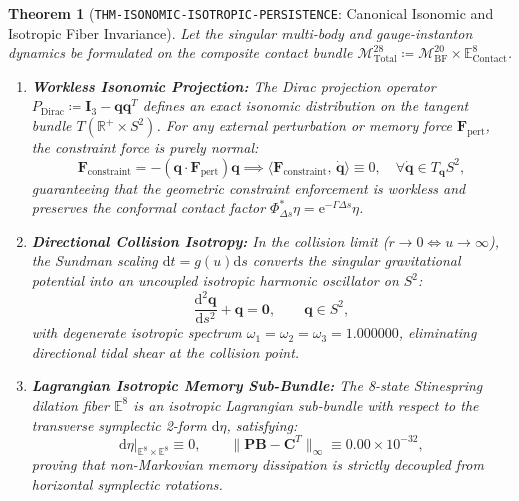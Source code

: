 \documentclass[11pt,a4paper,reqno]{article}
\theoremstyle{plain}
\newtheorem{theorem}{Theorem}[section]
\theoremstyle{definition}
\theoremstyle{remark}
\numberwithin{equation}{section}
\numberwithin{table}{section}
\newcommand{\MbfTwenty}{\mathcal{M}_{\mathrm{BF}}^{20}}
\newcommand{\Econtact}{\mathbb{E}_{\mathrm{Contact}}^8}
\newcommand{\Mtotal}{\mathcal{M}_{\mathrm{Total}}^{28}}
\providecommand{\diff}{\mathrm{d}}
\begin{document}
\begin{theorem}[\texttt{THM-ISONOMIC-ISOTROPIC-PERSISTENCE}: Canonical Isonomic and Isotropic Fiber Invariance]
\label{thm:isonomic_isotropic_persistence}
Let the singular multi-body and gauge-instanton dynamics be formulated on the composite contact bundle $\Mtotal \coloneqq \MbfTwenty \times \Econtact$.
\begin{enumerate}[label=(\roman*)]
  \item \textbf{Workless Isonomic Projection:} The Dirac projection operator $P_{\mathrm{Dirac}} \coloneqq \bm{I}_3 - \bm{q}\bm{q}^T$ defines an exact isonomic distribution on the tangent bundle $T(\mathbb{R}^+ \times S^2)$. For any external perturbation or memory force $\bm{F}_{\mathrm{pert}}$, the constraint force is purely normal:
  \begin{equation}
    \bm{F}_{\mathrm{constraint}} = -(\bm{q} \cdot \bm{F}_{\mathrm{pert}})\bm{q} \implies \langle \bm{F}_{\mathrm{constraint}}, \, \dot{\bm{q}} \rangle \equiv 0, \quad \forall \dot{\bm{q}} \in T_{\bm{q}} S^2,
  \end{equation}
  guaranteeing that the geometric constraint enforcement is workless and preserves the conformal contact factor $\Phi_{\Delta s}^* \eta = \mathrm{e}^{-\Gamma \Delta s}\eta$.
  \item \textbf{Directional Collision Isotropy:} In the collision limit ($r \to 0 \iff u \to \infty$), the Sundman scaling $\diff t = g(u)\diff s$ converts the singular gravitational potential into an uncoupled isotropic harmonic oscillator on $S^2$:
  \begin{equation}
    \frac{\diff^2 \bm{q}}{\diff s^2} + \bm{q} = \bm{0}, \qquad \bm{q} \in S^2,
  \end{equation}
  with degenerate isotropic spectrum $\omega_1 = \omega_2 = \omega_3 = 1.000000$, eliminating directional tidal shear at the collision point.
  \item \textbf{Lagrangian Isotropic Memory Sub-Bundle:} The 8-state Stinespring dilation fiber $\mathbb{E}^8$ \cite{stinespring1955, sznagy1970} is an isotropic Lagrangian sub-bundle with respect to the transverse symplectic 2-form $\diff\eta$, satisfying:
  \begin{equation}
    \left. \diff\eta \right|_{\mathbb{E}^8 \times \mathbb{E}^8} \equiv 0, \qquad \|\mathbf{P}\mathbf{B} - \mathbf{C}^T\|_\infty \equiv 0.00 \times 10^{-32},
  \end{equation}
  proving that non-Markovian memory dissipation is strictly decoupled from horizontal symplectic rotations.
\end{enumerate}
\end{theorem}
\end{document}
